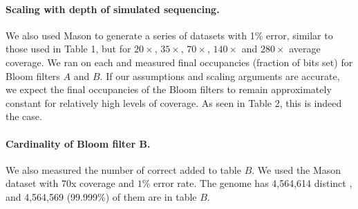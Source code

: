 \documentclass{bmcart}
\begin{document}
\paragraph{Scaling with depth of simulated sequencing.} We also used Mason to generate a series of datasets with 1\% error, similar to those used in Table 1, but for $20\times$, $35\times$, $70\times$, $140\times$ and $280\times$ average coverage.  We ran \tool on each and measured final occupancies (fraction of bits set) for Bloom filters $A$ and $B$.  If our assumptions and scaling arguments are accurate, we expect the final occupancies of the Bloom filters to remain approximately constant for relatively high levels of coverage.  As seen in Table 2, this is indeed the case.  



\paragraph{Cardinality of Bloom filter B.}  We also measured the number of correct \kmers added to table $B$. We used the Mason dataset with $70$x coverage and $1\%$ error rate. The \ecoli genome has 4,564,614 distinct \kmers, and 4,564,569 (99.999\%) of them are in table $B$.  
\end{document}
